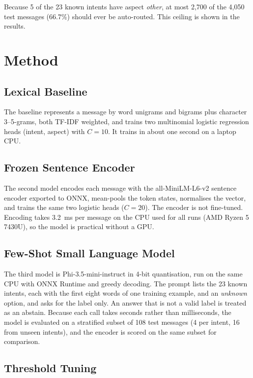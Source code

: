 \documentclass{icaiit2027}
\begin{document}
Because 5 of the 23 known intents have aspect \emph{other}, at most 2,700 of the 4,050 test messages (66.7\%) should ever be auto-routed. This ceiling is shown in the results.

\section{Method}

\subsection{Lexical Baseline}

The baseline represents a message by word unigrams and bigrams plus character 3--5-grams, both TF-IDF weighted, and trains two multinomial logistic regression heads (intent, aspect) with $C = 10$. It trains in about one second on a laptop CPU.

\subsection{Frozen Sentence Encoder}

The second model encodes each message with the all-MiniLM-L6-v2 sentence encoder \cite{reimers2019,wang2020} exported to ONNX, mean-pools the token states, normalises the vector, and trains the same two logistic heads ($C = 20$). The encoder is not fine-tuned. Encoding takes 3.2~ms per message on the CPU used for all runs (AMD Ryzen 5 7430U), so the model is practical without a GPU.

\subsection{Few-Shot Small Language Model}

The third model is Phi-3.5-mini-instruct \cite{abdin2024} in 4-bit quantisation, run on the same CPU with ONNX Runtime and greedy decoding. The prompt lists the 23 known intents, each with the first eight words of one training example, and an \emph{unknown} option, and asks for the label only. An answer that is not a valid label is treated as an abstain. Because each call takes seconds rather than milliseconds, the model is evaluated on a stratified subset of 108 test messages (4 per intent, 16 from unseen intents), and the encoder is scored on the same subset for comparison.

\subsection{Threshold Tuning}
\end{document}
